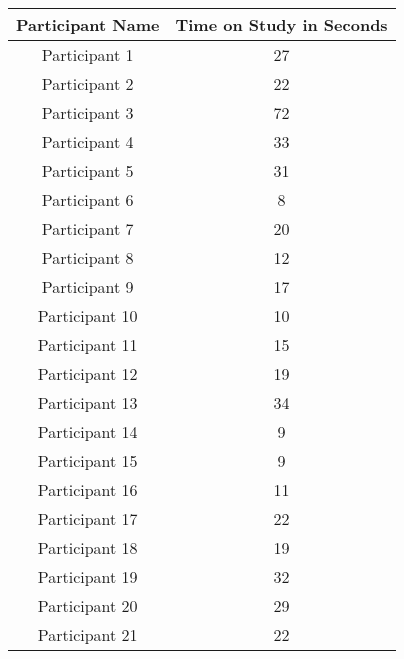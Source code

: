 \begin{table}[]
    \begin{tabular}{|c|c|}
    \hline
    \textbf{Participant Name} & \textbf{Time on Study in Seconds} \\ \hline
    Participant 1             & 27                                \\ \hline
    Participant 2             & 22                                \\ \hline
    Participant 3             & 72                                \\ \hline
    Participant 4             & 33                                \\ \hline
    Participant 5             & 31                                \\ \hline
    Participant 6             & 8                                \\ \hline
    Participant 7             & 20                                \\ \hline
    Participant 8             & 12                                \\ \hline
    Participant 9             & 17                                \\ \hline
    Participant 10             & 10                                \\ \hline
    Participant 11             & 15                                \\ \hline
    Participant 12             & 19                                \\ \hline
    Participant 13             & 34                                \\ \hline
    Participant 14             & 9                                \\ \hline
    Participant 15             & 9                                \\ \hline
    Participant 16             & 11                                \\ \hline
    Participant 17             & 22                                \\ \hline
    Participant 18             & 19                                \\ \hline
    Participant 19             & 32                                \\ \hline
    Participant 20             & 29                                \\ \hline
    Participant 21             & 22                                \\ \hline

\end{tabular}
\end{table}
